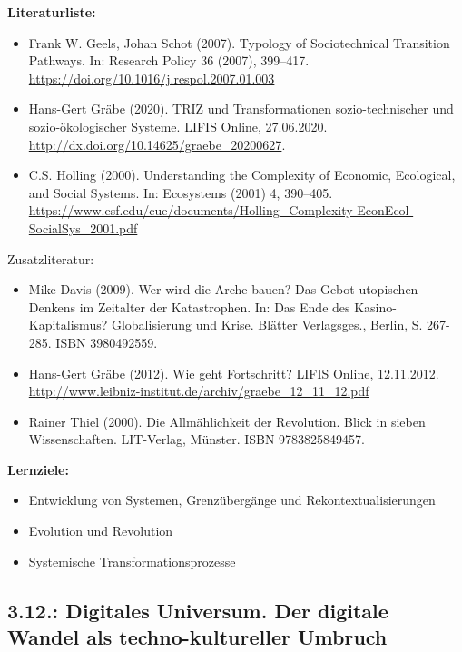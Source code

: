 \documentclass[11pt,a4paper]{article}
\begin{document}
\textbf{Literaturliste:}
\begin{itemize}[noitemsep]
\item Frank W. Geels, Johan Schot (2007). Typology of Sociotechnical
  Transition Pathways. In: Research Policy 36 (2007), 399–417.\\
  \url{https://doi.org/10.1016/j.respol.2007.01.003} 
\item Hans-Gert Gräbe (2020). TRIZ und Transformationen sozio-technischer und
  sozio-ökolo\-gischer Systeme. LIFIS Online, 27.06.2020.\\
  \url{http://dx.doi.org/10.14625/graebe_20200627}.
\item C.S. Holling (2000). Understanding the Complexity of Economic,
  Ecological, and Social Systems. In: Ecosystems (2001) 4, 390–405.\\
  {\scriptsize \url{https://www.esf.edu/cue/documents/Holling_Complexity-EconEcol-SocialSys_2001.pdf}}
\end{itemize}

Zusatzliteratur:
\begin{itemize}[noitemsep]
\item Mike Davis (2009).  Wer wird die Arche bauen? Das Gebot utopischen
  Denkens im Zeitalter der Katastrophen.  In: Das Ende des
  Kasino-Kapitalismus?  Globalisierung und Krise. Blätter
  Verlagsges., Berlin, S. 267-285. ISBN 3980492559. 
\item Hans-Gert Gräbe (2012). Wie geht Fortschritt? LIFIS Online,
  12.11.2012.\\ 
  \url{http://www.leibniz-institut.de/archiv/graebe_12_11_12.pdf}
\item Rainer Thiel (2000). Die Allmählichkeit der Revolution. Blick in sieben
  Wissenschaften.  LIT-Verlag, Münster. ISBN 9783825849457. 
\end{itemize}

\textbf{Lernziele:}
\begin{itemize}[noitemsep]
\item Entwicklung von Systemen, Grenzübergänge und Rekontextualisierungen 
\item Evolution und Revolution
\item Systemische Transformationsprozesse
\end{itemize}

\subsection{3.12.: Digitales Universum. Der digitale Wandel als
  techno-kultureller Umbruch}
\end{document}
